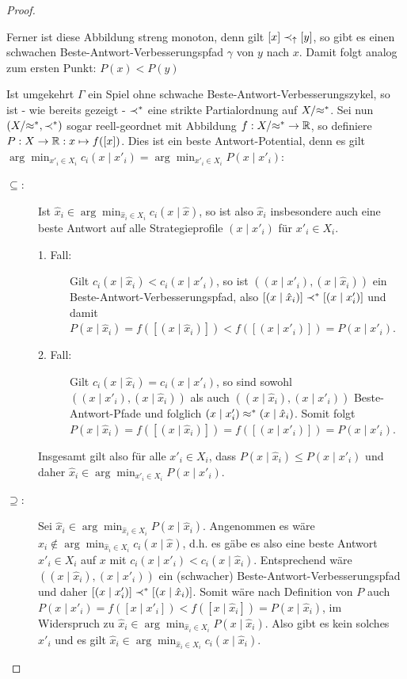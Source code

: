 \begin{proof}
\begin{enumerate}
		Ferner ist diese Abbildung streng monoton, denn gilt $[x] \prec_\uparrow [y]$, so gibt es einen schwachen Beste-Antwort-Verbesserungspfad $\gamma$ von $y$ nach $x$. Damit folgt analog zum ersten Punkt: $P(x) < P(y)$
	\end{enumerate}
	
	Ist umgekehrt $\Gamma$ ein Spiel ohne schwache Beste-Antwort-Verbesserungszykel, so ist - wie bereits gezeigt - $\prec^\ast$ eine strikte Partialordnung auf $X/{\approx^\ast}$. Sei nun $(X/{\approx^\ast}, \prec^\ast)$ sogar reell-geordnet mit Abbildung $f: X/{\approx^\ast} \to \mathbb{R}$, so definiere $P: X \to \mathbb{R}: x \mapsto f([x])$. Dies ist ein beste Antwort-Potential, denn es gilt $\arg \min_{x'_i \in X_i}c_i(x \mid x'_i) = \arg \min_{x'_i \in X_i} P(x \mid x'_i)$:
	\begin{description}
		\item[\glqq$\bm{\subseteq}$\grqq:] Ist $\hat{x}_i \in \arg \min_{\hat{x}_i \in X_i}c_i(x \mid \hat{x})$, so ist also $\hat{x}_i$ insbesondere auch eine beste Antwort auf alle Strategieprofile $(x \mid x'_i)$ für $x'_i \in X_i$.
			\begin{description}
				\item[1. Fall:] Gilt $c_i(x \mid \hat{x}_i) < c_i(x \mid x'_i)$, so ist $((x \mid x'_i), (x \mid \hat{x}_i))$ ein Beste-Antwort-Verbesserungspfad, also $[(x \mid \hat{x}_i)] \prec^\ast [(x \mid x'_i)]$ und damit $P(x \mid \hat{x}_i) = f([(x \mid \hat{x}_i)]) < f ([(x \mid x'_i)]) = P(x \mid x'_i)$.
				\item[2. Fall:] Gilt $c_i(x \mid \hat{x}_i) = c_i(x \mid x'_i)$, so sind sowohl $((x \mid x'_i), (x \mid \hat{x}_i))$ als auch $((x \mid \hat{x}_i), (x \mid x'_i))$ Beste-Antwort-Pfade und folglich $(x \mid x'_i) \approx^\ast (x \mid \hat{x}_i)$. Somit folgt $P(x \mid \hat{x}_i) = f([(x \mid \hat{x}_i)]) = f([(x \mid x'_i)]) = P(x \mid x'_i)$.
			\end{description}
			Insgesamt gilt also für alle $x'_i \in X_i$, dass $P(x \mid \hat{x}_i) \leq P(x \mid x'_i)$ und daher $\hat{x}_i \in \arg \min_{x'_i \in X_i} P(x \mid x'_i)$.
		\item[\glqq$\bm{\supseteq}$\grqq:] Sei $\hat{x}_i \in \arg \min_{\hat{x}_i \in X_i}P(x \mid \hat{x}_i)$. Angenommen es wäre $\hat{x}_i \notin \arg \min_{\hat{x}_i \in X_i}c_i(x \mid \hat{x})$, d.h. es gäbe es also eine beste Antwort $x'_i \in X_i$ auf $x$ mit $c_i(x \mid x'_i) < c_i(x \mid \hat{x}_i)$. Entsprechend wäre $((x \mid \hat{x}_i), (x \mid x'_i))$ ein (schwacher) Beste-Antwort-Verbesserungspfad und daher $[(x \mid x'_i)] \prec^\ast [(x \mid \hat{x}_i)]$. Somit wäre nach Definition von $P$ auch $P(x \mid x'_i) = f([x \mid x'_i]) < f([x \mid \hat{x}_i]) = P(x \mid \hat{x}_i)$, im Widerspruch zu $\hat{x}_i \in \arg \min_{\hat{x}_i \in X_i}P(x \mid \hat{x}_i)$. Also gibt es kein solches $x'_i$ und es gilt $\hat{x}_i \in \arg \min_{\hat{x}_i \in X_i}c_i(x \mid \hat{x}_i)$. \qedhere
	\end{description}
\end{proof}

